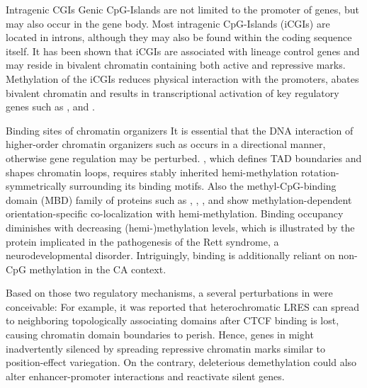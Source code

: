 \begin{mydescription}{0.5cm}
	\item [Intragenic CGIs] Genic CpG-Islands are not limited to the promoter of genes, but may also occur in the gene body. Most intragenic CpG-Islands (iCGIs) are located in introns, although they may also be found within the coding sequence itself. It has been shown that iCGIs are associated with lineage control genes and may reside in bivalent chromatin containing both active \hisfourthree and repressive \histwentyseventhree marks\cite{Lee2017}. Methylation of the iCGIs reduces physical interaction with the promoters, abates bivalent chromatin and results in transcriptional activation of key regulatory genes such as ,  and \cite{Lee2017}.
	\item [Binding sites of chromatin organizers] It is essential that the DNA interaction of higher-order chromatin organizers such as  occurs in a directional manner, otherwise gene regulation may be perturbed.  , which defines TAD boundaries and shapes chromatin loops, requires stably inherited hemi-methylation rotation-symmetrically surrounding its binding motifs\cite{Xu2018b}.  Also the  methyl-CpG-binding domain (MBD) family of proteins such as , , ,  and  show methylation-dependent\cite{Baubec2013} orientation-specific co-localization with hemi-methylation\cite{Xu2018b}. Binding occupancy diminishes with decreasing (hemi-)methylation levels, which is illustrated by the  protein implicated in the pathogenesis of the Rett syndrome, a neurodevelopmental disorder\cite{Kinde2016}. Intriguingly,  binding is additionally reliant on non-CpG methylation in the CA context\cite{Kinde2016}. 
\end{mydescription}  

Based on those two regulatory mechanisms, a several perturbations in \dnmtchip were conceivable: For example, it was reported that heterochromatic LRES can spread to neighboring topologically associating domains after CTCF binding is lost, causing chromatin domain boundaries to perish\cite{Forn2013}. Hence, genes in \dnmtchip might inadvertently silenced by spreading repressive chromatin marks similar to position-effect variegation\cite{Wakimoto1998}. On the contrary, deleterious demethylation could also alter enhancer-promoter interactions and reactivate silent genes. 

